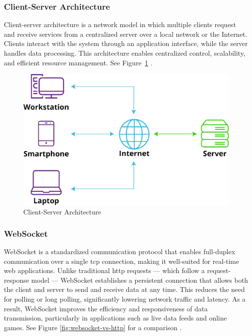 {\subsubsection*{Client-Server Architecture}
\label{subsubsec:client-server}

Client-server architecture is a network model in which multiple clients request and receive services from a centralized server over a local network or the Internet. Clients interact with the system through an application interface, while the server handles data processing. This architecture enables centralized control, scalability, and efficient resource management. See Figure~\ref{fig:client-server-architecture} \cite{liquidweb:client-server}.


\begin{figure}[h!]
    \centering
    \includegraphics[width=0.75\linewidth]{figures/theory/client-server-architecture.png}
    \caption[Client-Server Architecture]{Client-Server Architecture \cite{liquidweb:client-server}}
    \label{fig:client-server-architecture}
\end{figure}

\subsubsection*{WebSocket}
\label{subsubsec:websocket}

WebSocket is a standardized communication protocol that enables full-duplex communication over a single \gls{tcp} connection, making it well-suited for real-time web applications. Unlike traditional \gls{http} requests — which follow a request-response model — WebSocket establishes a persistent connection that allows both the client and server to send and receive data at any time. This reduces the need for polling or long polling, significantly lowering network traffic and latency. As a result, WebSocket improves the efficiency and responsiveness of data transmission, particularly in applications such as live data feeds and online games. See Figure \ref{fig:websocket-vs-http} for a comparison \cite{nodejs:websocket, apidog:websocket}.


}

